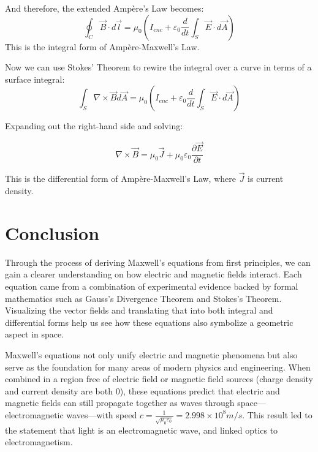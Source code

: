 \documentclass{article}
\begin{document}
And therefore, the extended Ampère's Law becomes:
\begin{equation}
\boxed{\oint_{C} \vec B \cdot d\vec l = \mu_0 ( I_{enc} + \varepsilon_0 \frac{d}{dt}\int_S \vec E \cdot d\vec A )}
\end{equation}
This is the integral form of Ampère-Maxwell's Law.

Now we can use Stokes' Theorem to rewire the integral over a curve in terms of a surface integral:
\begin{equation}
\int_S \nabla \times \vec Bd\vec A = \mu_0 ( I_{enc} + \varepsilon_0 \frac{d}{dt}\int_S \vec E \cdot d\vec A )
\end{equation}

Expanding out the right-hand side and solving:

\begin{equation}
\boxed{\nabla \times \vec B = \mu_0\vec J + \mu_0\varepsilon_0 \frac{\partial\vec E}{\partial t}}
\end{equation}

This is the differential form of Ampère-Maxwell's Law, where $\vec J$ is current density.

\pagebreak
\section{Conclusion}

Through the process of deriving Maxwell's equations from first principles, we can gain a clearer understanding on how electric and magnetic fields interact. Each equation came from a combination of experimental evidence backed by formal mathematics such as Gauss's Divergence Theorem and Stokes's Theorem. Visualizing the vector fields and translating that into both integral and differential forms help us see how these equations also symbolize a geometric aspect in space.

\vspace{1em}
Maxwell’s equations not only unify electric and magnetic phenomena but also serve as the foundation for many areas of modern physics and engineering. When combined in a region free of electric field or magnetic field sources (charge density and current density are both 0), these equations predict that electric and magnetic fields can still propagate together as waves through space—electromagnetic waves—with speed $ c = \frac{1}{\sqrt{\mu_0 \varepsilon_0}} = 2.998 \times 10^8 m/s $. This result led to the statement that light is an electromagnetic wave, and linked optics to electromagnetism.
\end{document}
